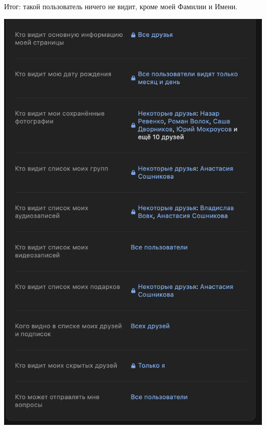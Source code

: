 \documentclass{article}
\begin{document}
Итог: такой пользователь ничего не видит, кроме моей Фамилии и Имени.

\begin{center}
    \includegraphics[width=.9\textwidth]{6}
\end{center}
\end{document}
